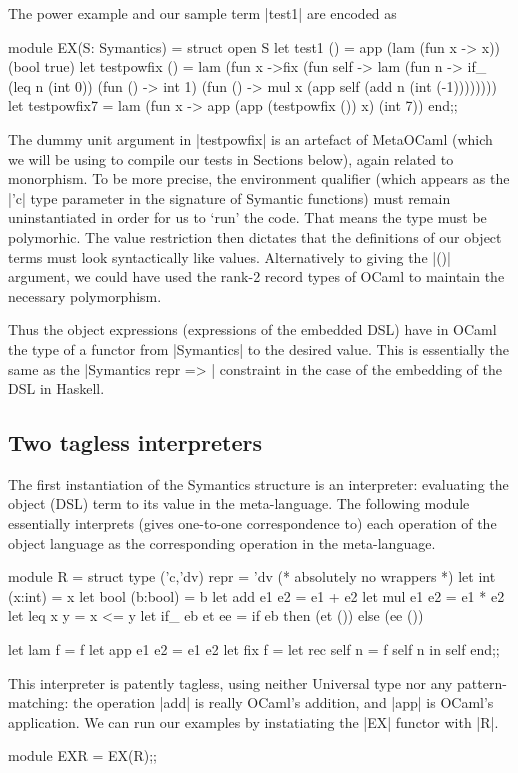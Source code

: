 \documentclass[preprint]{sigplanconf}
\begin{document}
The power example and our sample term |test1| are encoded as
\begin{code}
module EX(S: Symantics) = struct
 open S
 let test1 () = app (lam (fun x -> x)) (bool true)
 let testpowfix () = 
   lam (fun x ->fix (fun self -> lam (fun n ->
     if_ (leq n (int 0)) (fun () -> int 1)
         (fun () -> mul x (app self 
                               (add n (int (-1))))))))
 let testpowfix7 = 
    lam (fun x -> app (app (testpowfix ()) x) (int 7))
end;;
\end{code}
The dummy unit argument in |testpowfix| is an artefact of MetaOCaml
(which we will be using to compile our tests in Sections below),
again related to monorphism. To be
more precise, the environment qualifier (which appears as the |'c|
type parameter in the signature of Symantic functions) must remain
uninstantiated in order for us to `run' the code. That means the type
must be polymorhic. The value restriction then dictates that
the definitions of our object terms must look syntactically like
values. Alternatively to giving the |()| argument, we could have used
the rank-2 record types of OCaml to maintain the necessary polymorphism.

Thus the object expressions (expressions of the embedded DSL) have in
OCaml the type of a functor from |Symantics| to the desired value. This
is essentially the same as the |Symantics repr => | constraint in the case of
the embedding of the DSL in Haskell.

\subsection{Two tagless interpreters}
The first instantiation of the Symantics structure is an interpreter:
evaluating the object (DSL) term to its value in the meta-language. 
The following module essentially interprets (gives one-to-one
correspondence to) each operation of the object language as the
corresponding operation in the meta-language.
\begin{code}
module R  = struct
  type ('c,'dv) repr = 'dv (* absolutely no wrappers *)
  let int  (x:int)  = x
  let bool (b:bool) = b
  let add  e1 e2    = e1 + e2
  let mul  e1 e2    = e1 * e2
  let leq  x y      = x <= y
  let if_  eb et ee = if eb then (et ()) else (ee ())

  let lam f         = f
  let app e1 e2     = e1 e2
  let fix f         = let rec self n = f self n in self
end;;
\end{code}

This interpreter is patently tagless, using neither Universal type nor
any pattern-matching: the operation |add| is really
OCaml's addition, and |app| is OCaml's application. We can run our
examples by instatiating the |EX| functor with |R|.
\noindent
\begin{code}
  module EXR = EX(R);;
\end{code}
\end{document}
